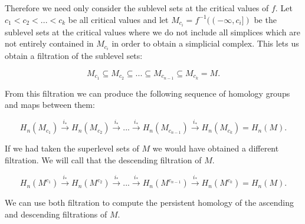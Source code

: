 Therefore we need only consider the sublevel sets at the critical values of $f$. Let $c_1 < c_2 < ... < c_k$ be all critical values and let $M_{c_i} = f^{-1}((-\infty, c_i])$ be the sublevel sets at the critical values where we do not include all simplices which are not entirely contained in $M_{c_i}$ in order to obtain a simplicial complex. This lets us obtain a filtration of the sublevel sets:

$$ M_{c_1} \subseteq M_{c_2} \subseteq ... \subseteq M_{c_{n-1}} \subseteq M_{c_k} = M.$$

From this filtration we can produce the following sequence of homology groups and maps between them:

$$ H_n(M_{c_1}) \overset{i_*}{\longrightarrow} H_n(M_{c_2}) \overset{i_*}{\longrightarrow} ... \overset{i_*}{\longrightarrow} H_n(M_{c_{n-1}}) \overset{i_*}{\longrightarrow} H_n(M_{c_k}) = H_n(M).$$

If we had taken the superlevel sets of $M$ we would have obtained a different filtration. We will call that the descending filtration of $M$.

$$ H_n(M^{c_1}) \overset{i_*}{\longrightarrow} H_n(M^{c _2}) \overset{i_*}{\longrightarrow} ... \overset{i_*}{\longrightarrow} H_n(M^{c_{n-1}}) \overset{i_*}{\longrightarrow} H_n(M^{c_k}) = H_n(M).$$

We can use both filtration to compute the persistent homology of the ascending and descending filtrations of $M$.


%


